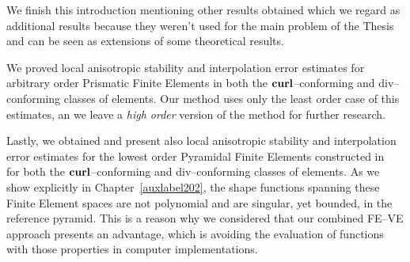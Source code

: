 We finish this introduction mentioning other results obtained which we regard
as additional results because they weren't used
for the main problem
of the Thesis and can be seen as extensions of some theoretical results.

We proved local anisotropic 
stability and
interpolation error estimates for arbitrary order Prismatic Finite Elements in both
the $\textbf{curl}$--conforming and div--conforming classes of elements. 
Our method uses only
the least order case of this estimates, an we leave a \emph{high order} version
of the method for further research.

Lastly, we obtained and present also local anisotropic stability
and interpolation error estimates for the lowest order Pyramidal
Finite Elements constructed in~\cite{gh99, Nigam-2012} for both
the $\textbf{curl}$--conforming and div--conforming classes of elements. As we show
explicitly in Chapter~\ref{auxlabel202}, the shape functions 
spanning these Finite Element spaces are not polynomial and are singular, yet bounded,
in the reference pyramid. This is a reason why we considered that
our combined FE--VE approach presents an advantage, which is avoiding the evaluation
of functions with those properties in computer implementations.   

